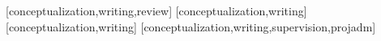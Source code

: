 \documentclass[portuguese]{textolivre}
\begin{document}
\printbibliography\label{sec-bib}


\begin{contributors}
[conceptualization,writing,review]
[conceptualization,writing]
[conceptualization,writing]
[conceptualization,writing,supervision,projadm]
\end{contributors}
\end{document}
